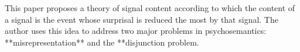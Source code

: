\documentclass[a4paper]{article}
\title{}
\date{}
\begin{document}
\maketitle
    
    \cite{weissglass-2019-greatest-surprise-reduction-semantics-an-information-theoretic-solution-to-misrepresentation-and-disjunction} This paper proposes a theory of signal content according to which the content of a signal is the event whose surprisal is reduced the most by that signal. The author uses this idea to address two major problems in psychosemantics: **misrepresentation** and the **disjunction problem.
    
    
\end{document}
